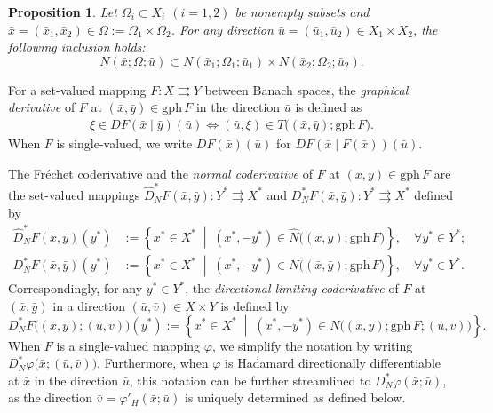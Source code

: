 \documentclass[12pt,twoside,reqno]{amsart}
\newtheorem{proposition}[theorem]{Proposition}
\theoremstyle{definition}
\numberwithin{equation}{section}
\begin{document}
\begin{proposition} \label{prop:dir_normal_product}
Let $\Omega_i \subset X_i$ $(i=1, 2)$ be nonempty subsets and $\bar{x} = (\bar{x}_1, \bar{x}_2) \in \Omega := \Omega_1 \times \Omega_2$. For any direction $\bar{u} = (\bar{u}_1, \bar{u}_2) \in X_1 \times X_2$, the following inclusion holds:
\begin{equation}
    N(\bar{x}; \Omega; \bar{u}) \subset N(\bar{x}_1; \Omega_1; \bar{u}_1) \times N(\bar{x}_2; \Omega_2; \bar{u}_2).
\end{equation}
\end{proposition}

For a set-valued mapping $F: X \rightrightarrows Y$ between Banach spaces, the \emph{graphical derivative} of $F$ at $(\bar{x}, \bar{y}) \in \mathrm{gph}\, F$ in the direction $\bar{u}$ is defined as  
\begin{equation*}
    \begin{aligned}
        \xi \in DF(\bar{x} \mid \bar{y})(\bar{u}) \iff (\bar{u}, \xi) \in T\bigl((\bar{x}, \bar{y}); \mathrm{gph}\, F\bigr).
    \end{aligned}
\end{equation*}
When $F$ is single-valued, we write $DF(\bar{x})(\bar{u})$ for $DF(\bar{x} \mid F(\bar{x}))(\bar{u})$.

The Fr\'echet coderivative and the \emph{normal coderivative} of $F$ at $(\bar{x}, \bar{y}) \in \mathrm{gph}\, F$ are the set-valued mappings $\widehat{D}_N^* F(\bar{x}, \bar{y}): Y^* \rightrightarrows X^*$ and $D_N^* F(\bar{x}, \bar{y}): Y^* \rightrightarrows X^*$ defined by
\begin{align*}
    \widehat{D}_N^* F(\bar{x}, \bar{y})(y^*) &:= \left\{ x^* \in X^* \;\middle|\; (x^*, -y^*) \in \widehat{N}\big((\bar{x}, \bar{y}); \mathrm{gph}\, F\big) \right\}, \quad \forall y^* \in Y^*;\\
    D_N^* F(\bar{x}, \bar{y})(y^*) &:= \left\{ x^* \in X^* \;\middle|\; (x^*, -y^*) \in N\big((\bar{x}, \bar{y}); \mathrm{gph}\, F\big) \right\}, \quad \forall y^* \in Y^*.
\end{align*}
Correspondingly, for any \(y^*\in Y^*\), the \emph{directional limiting
coderivative} of \(F\) at \((\bar{x},\bar{y})\) in a direction
\((\bar{u},\bar{v})\in X\times Y\) is defined by
\begin{equation*}
    D_N^* F\big((\bar{x}, \bar{y}); (\bar{u}, \bar{v})\big)(y^*) := \left\{ x^* \in X^* \;\middle|\; (x^*, -y^*) \in N\big((\bar{x}, \bar{y}); \mathrm{gph}\, F; (\bar{u}, \bar{v})\big) \right\}.
\end{equation*}
When $F$ is a single-valued mapping $\varphi$, we simplify the notation by writing $D_N^* \varphi\big(\bar{x}; (\bar{u}, \bar{v})\big)$. Furthermore, when $\varphi$ is Hadamard directionally differentiable at $\bar{x}$ in the direction $\bar{u}$, this notation can be further streamlined to $D_N^* \varphi(\bar{x}; \bar{u})$, as the direction $\bar{v} = \varphi'_H(\bar{x}; \bar{u})$ is uniquely determined as defined below. 
\end{document}
